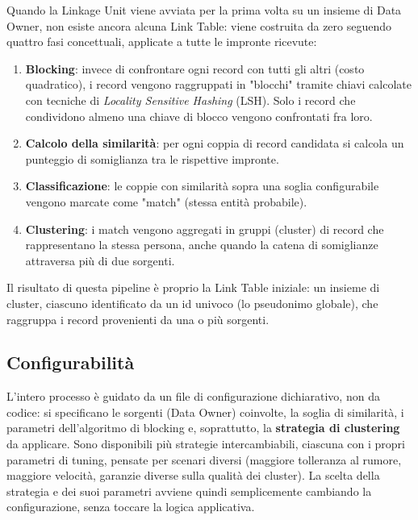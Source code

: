 \documentclass[11pt,a4paper]{article}
\begin{document}
Quando la Linkage Unit viene avviata per la prima volta su un insieme di Data
Owner, non esiste ancora alcuna Link Table: viene costruita da zero seguendo
quattro fasi concettuali, applicate a tutte le impronte ricevute:

\begin{enumerate}
    \item \textbf{Blocking}: invece di confrontare ogni record con tutti gli
        altri (costo quadratico), i record vengono raggruppati in "blocchi"
        tramite chiavi calcolate con tecniche di \emph{Locality Sensitive
        Hashing} (LSH). Solo i record che condividono almeno una chiave di
        blocco vengono confrontati fra loro.
    \item \textbf{Calcolo della similarit\`a}: per ogni coppia di record
        candidata si calcola un punteggio di somiglianza tra le rispettive
        impronte.
    \item \textbf{Classificazione}: le coppie con similarit\`a sopra una soglia
        configurabile vengono marcate come "match" (stessa entit\`a probabile).
    \item \textbf{Clustering}: i match vengono aggregati in gruppi (cluster) di
        record che rappresentano la stessa persona, anche quando la catena di
        somiglianze attraversa pi\`u di due sorgenti.
    \end{enumerate}

Il risultato di questa pipeline \`e proprio la Link Table iniziale: un insieme
di cluster, ciascuno identificato da un id univoco (lo pseudonimo globale), che
raggruppa i record provenienti da una o pi\`u sorgenti.

\subsection{Configurabilit\`a}

L'intero processo \`e guidato da un file di configurazione dichiarativo, non da
codice: si specificano le sorgenti (Data Owner) coinvolte, la soglia di
similarit\`a, i parametri dell'algoritmo di blocking e, soprattutto, la
\textbf{strategia di clustering} da applicare. Sono disponibili pi\`u strategie
intercambiabili, ciascuna con i propri parametri di tuning, pensate per scenari
diversi (maggiore tolleranza al rumore, maggiore velocit\`a, garanzie diverse
sulla qualit\`a dei cluster). La scelta della strategia e dei suoi parametri
avviene quindi semplicemente cambiando la configurazione, senza toccare la
logica applicativa.
\end{document}
